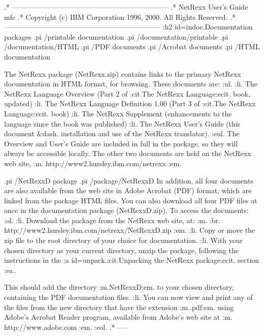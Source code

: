 .* ------------------------------------------------------------------
.* NetRexx User's Guide                                              mfc
.* Copyright (c) IBM Corporation 1996, 2000.  All Rights Reserved.
.* ------------------------------------------------------------------
:h2 id=indoc.Documentation packages
.pi /printable documentation
.pi /documentation/printable
.pi /documentation/HTML
.pi /PDF documents
.pi /Acrobat documents
.pi /HTML documentation

The NetRexx package (NetRexx.zip) contains links to the primary NetRexx
documentation in HTML format, for browsing.
These documents are:
:ul.
:li.
The NetRexx Language Overview (Part 2 of :cit.The NetRexx
Language:ecit. book, updated)
:li.
The NetRexx Language Definition 1.00 (Part 3 of :cit.The NetRexx
Language:ecit. book)
:li.
The NetRexx Supplement (enhancements to the language since the book
was published)
:li.
The NetRexx User's Guide (this document &dash. installation and use of
the NetRexx translator).
:eul.
The Overview and User's Guide are included in full in the package, so
they will always be accessible locally.  The other two documents are
held on the NetRexx web site, :m.
http://www2.hursley.ibm.com/netrexx
:em.

.pi /NetRexxD package
.pi /package/NetRexxD
In addition, all four documents are also available from the web site in
Adobe Acrobat (PDF) format, which are linked from the package HTML files.
You can also download all four PDF files at once in the documentation
package (NetRexxD.zip).  To access the documents:
:ol.
:li.
Download the package from the NetRexx web site, at: :m.
:br.
http://www2.hursley.ibm.com/netrexx/NetRexxD.zip
:em.
:li.
Copy or move the zip file to the root directory of your choice for
documentation.
:li.
With your chosen directory as your current directory, unzip the
package, following the instructions in the :a id=unpack.:cit.Unpacking
the NetRexx package:ecit. section :ea..

This should add the directory :m.NetRexxD:em. to your chosen directory,
containing the PDF documentation files.
:li.
You can now view and print any of the files from the new directory that
have the extension :m..pdf:em. using Adobe's Acrobat Reader
program, available from Adobe's web site at :m.
http://www.adobe.com
:em.
:eol.
.* -----
